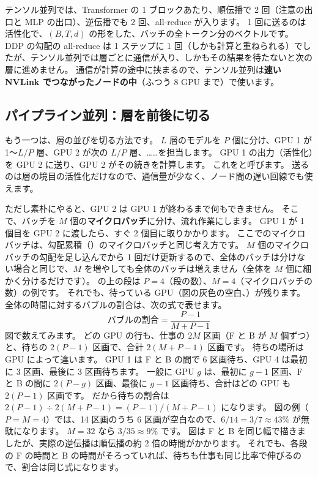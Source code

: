 テンソル並列では、Transformer の 1 ブロックあたり、順伝播で 2 回（注意の出口と MLP の出口）、逆伝播でも 2 回、all-reduce が入ります。
1 回に送るのは活性化で、$(B,T,d)$ の形をした、バッチの全トークン分のベクトルです。
DDP の勾配の all-reduce は 1 ステップに 1 回（しかも計算と重ねられる）でしたが、テンソル並列では層ごとに通信が入り、しかもその結果を待たないと次の層に進めません。
通信が計算の途中に挟まるので、テンソル並列は\textbf{速い NVLink でつながったノードの中}（ふつう 8 GPU まで）で使います。

\subsection*{パイプライン並列：層を前後に切る}

もう一つは、層の並びを切る方法です。
$L$ 層のモデルを $P$ 個に分け、GPU 1 が 1〜$L/P$ 層、GPU 2 が次の $L/P$ 層、……を担当します。
GPU 1 の出力（活性化）を GPU 2 に送り、GPU 2 がその続きを計算します。
これをと呼びます。
送るのは層の境目の活性化だけなので、通信量が少なく、ノード間の遅い回線でも使えます。

ただし素朴にやると、GPU 2 は GPU 1 が終わるまで何もできません。
そこで、バッチを $M$ 個の\textbf{マイクロバッチ}に分け、流れ作業にします。
GPU 1 が 1 個目を GPU 2 に渡したら、すぐ 2 個目に取りかかります。
ここでのマイクロバッチは、勾配累積（）のマイクロバッチと同じ考え方です。
$M$ 個のマイクロバッチの勾配を足し込んでから 1 回だけ更新するので、全体のバッチは分けない場合と同じで、$M$ を増やしても全体のバッチは増えません（全体を $M$ 個に細かく分けるだけです）。
の上の段は $P=4$（段の数）、$M=4$（マイクロバッチの数）の例です。
それでも、待っている GPU（図の灰色の空白、）が残ります。
全体の時間に対するバブルの割合は、次の式で表せます\cite{huang2019gpipe,narayanan2021efficient}。
\begin{equation}
\text{バブルの割合}=\frac{P-1}{M+P-1}
\label{eq:dist-bubble}
\end{equation}
図で数えてみます。
どの GPU の行も、仕事の $2M$ 区画（F と B が $M$ 個ずつ）と、待ちの $2(P-1)$ 区画で、合計 $2(M+P-1)$ 区画です。
待ちの場所は GPU によって違います。
GPU 1 は F と B の間で 6 区画待ち、GPU 4 は最初に 3 区画、最後に 3 区画待ちます。
一般に GPU $g$ は、最初に $g-1$ 区画、F と B の間に $2(P-g)$ 区画、最後に $g-1$ 区画待ち、合計はどの GPU も $2(P-1)$ 区画です。
だから待ちの割合は $2(P-1)\div 2(M+P-1)=(P-1)/(M+P-1)$ になります。
図の例（$P=M=4$）では、14 区画のうち 6 区画が空白なので、$6/14=3/7\approx 43\%$ が無駄になります。
$M=32$ なら $3/35\approx 9\%$ です。
図は F と B を同じ幅で描きましたが、実際の逆伝播は順伝播の約 2 倍の時間がかかります。
それでも、各段の F の時間と B の時間がそろっていれば、待ちも仕事も同じ比率で伸びるので、割合は同じ式になります。

